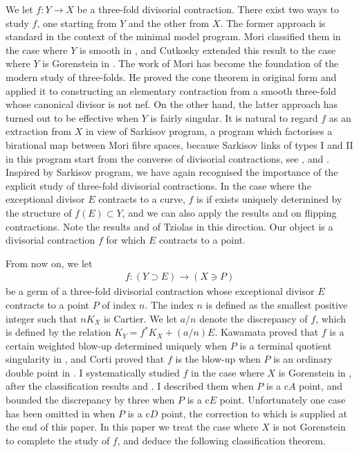 \documentclass[a4paper,11pt]{amsart}
\theoremstyle{definition}
\theoremstyle{remark}
\numberwithin{equation}{section}
\begin{document}
We let $f \colon Y \to X$ be a three-fold divisorial contraction.
There exist two ways to study $f$,
one starting from $Y$ and the other from $X$.
The former approach is standard in the context of the minimal model program.
Mori classified them in the case where $Y$ is smooth in \cite{Mo82},
and Cutkosky extended this result
to the case where $Y$ is Gorenstein in \cite{Cu88}.
The work \cite{Mo82} of Mori has become the foundation of
the modern study of three-folds.
He proved the cone theorem in original form
and applied it to constructing an elementary contraction
from a smooth three-fold whose canonical divisor is not nef.
On the other hand,
the latter approach has turned out to be effective when $Y$ is fairly singular.
It is natural to regard $f$ as an extraction from $X$
in view of Sarkisov program,
a program which factorises a birational map between Mori fibre spaces,
because Sarkisov links of types I and II in this program start from
the converse of divisorial contractions,
see \cite{Co95}, \cite{CM00} and \cite{CPR00}.
Inspired by Sarkisov program,
we have again recognised the importance of
the explicit study of three-fold divisorial contractions.
In the case where the exceptional divisor $E$ contracts to a curve,
$f$ is if exists uniquely determined by the structure of $f(E) \subset Y$,
and we can also apply the results \cite{KM92} and \cite{Mo88}
on flipping contractions.
Note the results \cite{Tzi02a} and \cite{Tzi02p} of Tziolas in this direction.
Our object is a divisorial contraction $f$ for which $E$ contracts to a point.

From now on,
we let
\begin{align*}
f \colon (Y \supset E) \to (X \ni P)
\end{align*}
be a germ of a three-fold divisorial contraction
whose exceptional divisor $E$ contracts to a point $P$ of index $n$.
The index $n$ is defined as the smallest positive integer
such that $nK_X$ is Cartier.
We let $a/n$ denote the discrepancy of $f$,
which is defined by the relation $K_Y=f^*K_X+(a/n)E$.
Kawamata proved that $f$ is a certain weighted blow-up determined uniquely
when $P$ is a terminal quotient singularity in \cite{Km96},
and Corti proved that $f$ is the blow-up
when $P$ is an ordinary double point in \cite{Co00}.
I systematically studied $f$
in the case where $X$ is Gorenstein in \cite{Ka03},
after the classification results \cite{Ka01} and \cite{Ka02}.
I described them when $P$ is a c$A$ point,
and bounded the discrepancy by three when $P$ is a c$E$ point.
Unfortunately one case has been omitted in \cite{Ka03}
when $P$ is a c$D$ point,
the correction to which is supplied at the end of this paper.
In this paper
we treat the case where $X$ is not Gorenstein
to complete the study of $f$,
and deduce the following classification theorem.
\end{document}
